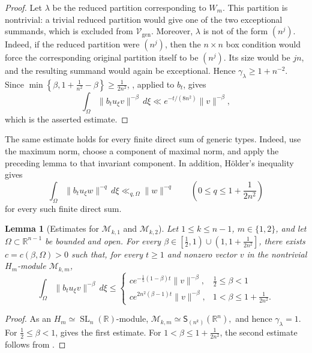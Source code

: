 \documentclass[reqno,11pt]{amsart}
\numberwithin{equation}{section}
\newtheorem{lemma}[theorem]{Lemma}
\theoremstyle{definition}
\theoremstyle{remark}
\newcommand{\op}{\operatorname}
\newcommand{\SL}{\op{SL}}
\begin{document}
\begin{proof}
Let $\lambda$ be the reduced partition corresponding to $W_m$. This
partition is nontrivial: a trivial reduced partition would give one of the
two exceptional summands, which is excluded from
$\mathcal V_{\op{gen}}$. Moreover, $\lambda$ is not of the form
$(n^j)$. Indeed, if the reduced partition were $(n^j)$, then the
$n\times n$ box condition would force the corresponding original partition
itself to be $(n^j)$. Its size would be $jn$, and the resulting summand
would again be exceptional. Hence $\gamma_\lambda\geq1+n^{-2}$. Since
$\min\left\{\beta,1+\frac1{n^2}-\beta\right\}
\ge\frac1{2n^2}$,
, applied to $b_t$, gives
$$
\int_\Omega\|b_tu_\xi v\|^{-\beta}\,d\xi
\ll e^{-t/(8n^2)}\|v\|^{-\beta},
$$
which is the asserted estimate.
\end{proof}

The same estimate holds for every finite direct sum of generic types. Indeed,
use the maximum norm, choose a component of maximal norm, and apply the
preceding lemma to that invariant component. In addition, H\"older's
inequality gives
\begin{equation}
\label{eq:generic-small-exponent-bound}
\int_\Omega\|b_tu_\xi w\|^{-q}\,d\xi
\ll_{q,\Omega}\|w\|^{-q}
\qquad
\left(0\le q\le1+\frac1{2n^2}\right)
\end{equation}
for every such finite direct sum.

\begin{lemma}[Estimates for $\mathcal M_{k,1}$ and $\mathcal M_{k,2}$]
\label{lem:generalweightedcontraction'}
Let $1\le k\le n-1$, $m\in\{1,2\}$, and let
$\Omega\subset\mathbb R^{n-1}$ be bounded and open. For every
$\beta\in \left[\frac{1}2,1\right) \cup \left(1,1+ \frac{1}{2n^2}\right]$,
there exists $c=c(\beta,\Omega)>0$ such that, for every $t\ge1$ and
 nonzero vector $v$ in the nontrivial $H_m$-module
$\mathcal M_{k,m}$,
$$
\int_\Omega\|b_tu_\xi v\|^{-\beta}\,d\xi
\le
\begin{cases}
c e^{-\frac15(1-\beta)t}\|v\|^{-\beta},
& \frac12\le\beta<1\\ 
c e^{2n^2(\beta-1)t}\|v\|^{-\beta},
& 1<\beta\le1+\frac{1}{2n^2}.
\end{cases}
$$
\end{lemma}

\begin{proof}
As an $H_m\simeq\SL_n(\mathbb R)$-module,
$\mathcal M_{k,m}\simeq{\mathsf S}_{(n^k)}(\mathbb R^n),$
and hence $\gamma_\lambda=1$. For $\frac12\le\beta<1$,
 gives the first estimate. For
$1<\beta\le1+\frac1{2n^2}$, the second estimate follows from
.
\end{proof}
\end{document}
